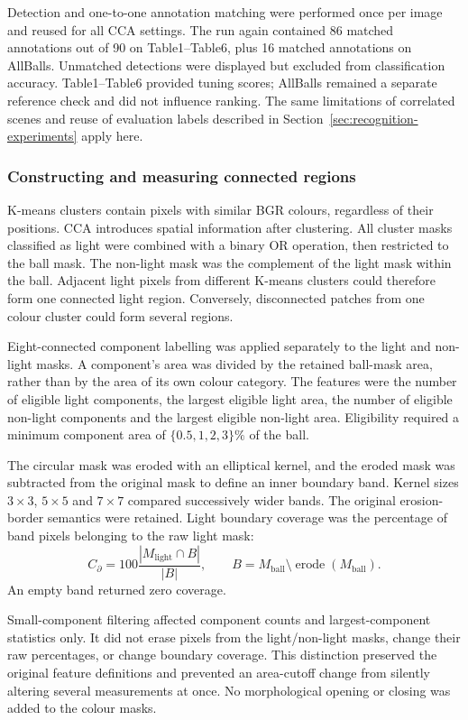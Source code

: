 Detection and one-to-one annotation matching were performed once per image
and reused for all CCA settings. The run again contained 86 matched
annotations out of 90 on Table1--Table6, plus 16 matched annotations on
AllBalls. Unmatched detections were displayed but excluded from classification
accuracy. Table1--Table6 provided tuning scores; AllBalls remained a separate
reference check and did not influence ranking. The same limitations of
correlated scenes and reuse of evaluation labels described in
Section~\ref{sec:recognition-experiments} apply here.

\subsubsection{Constructing and measuring connected regions}

K-means clusters contain pixels with similar BGR colours, regardless of their
positions. CCA introduces spatial information after clustering. All cluster
masks classified as light were combined with a binary OR operation, then
restricted to the ball mask. The non-light mask was the complement of the
light mask within the ball. Adjacent light pixels from different K-means
clusters could therefore form one connected light region. Conversely,
disconnected patches from one colour cluster could form several regions.

Eight-connected component labelling was applied separately to the light and
non-light masks. A component's area was divided by the retained ball-mask
area, rather than by the area of its own colour category. The features were
the number of eligible light components, the largest eligible light area,
the number of eligible non-light components and the largest eligible
non-light area. Eligibility required a minimum component area of
$\{0.5,1,2,3\}\%$ of the ball.

The circular mask was eroded with an elliptical kernel, and the eroded mask
was subtracted from the original mask to define an inner boundary band.
Kernel sizes $3\times3$, $5\times5$ and $7\times7$ compared successively
wider bands. The original erosion-border semantics were retained. Light
boundary coverage was the percentage of band pixels belonging to the raw
light mask:
\[
 C_{\partial}=100\frac{|M_{\mathrm{light}}\cap B|}{|B|},\qquad
 B=M_{\mathrm{ball}}\setminus\operatorname{erode}(M_{\mathrm{ball}}).
\]
An empty band returned zero coverage.

Small-component filtering affected component counts and largest-component
statistics only. It did not erase pixels from the light/non-light masks,
change their raw percentages, or change boundary coverage. This distinction
preserved the original feature definitions and prevented an area-cutoff
change from silently altering several measurements at once. No morphological
opening or closing was added to the colour masks.

